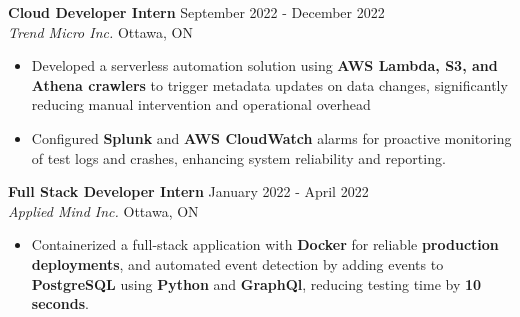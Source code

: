 \documentclass[a4paper]{article}
\begin{document}
\textbf{Cloud Developer Intern} \hfill September 2022 - December 2022\\
\textit{Trend Micro Inc.} \hfill Ottawa, ON\\
\vspace{-2mm}
\begin{itemize} \itemsep -2pt
        \item Developed a serverless automation solution using \textbf{AWS Lambda, S3, and Athena crawlers} to trigger metadata updates on data changes, significantly reducing manual intervention and operational overhead
        \item Configured \textbf{Splunk} and \textbf{AWS CloudWatch} alarms for proactive monitoring of test logs and crashes, enhancing system reliability and reporting.
\end{itemize}

\textbf{Full Stack Developer Intern} \hfill January 2022 - April 2022\\
\textit{Applied Mind Inc.} \hfill Ottawa, ON\\
\vspace{-2mm}
\begin{itemize} \itemsep -2pt
	\item Containerized a full-stack application with \textbf{Docker} for reliable \textbf{production deployments}, and automated event detection by adding events to \textbf{PostgreSQL} using \textbf{Python} and \textbf{GraphQl}, reducing testing time by \textbf{10 seconds}.
\end{itemize}

\vspace{5mm}
\end{document}
